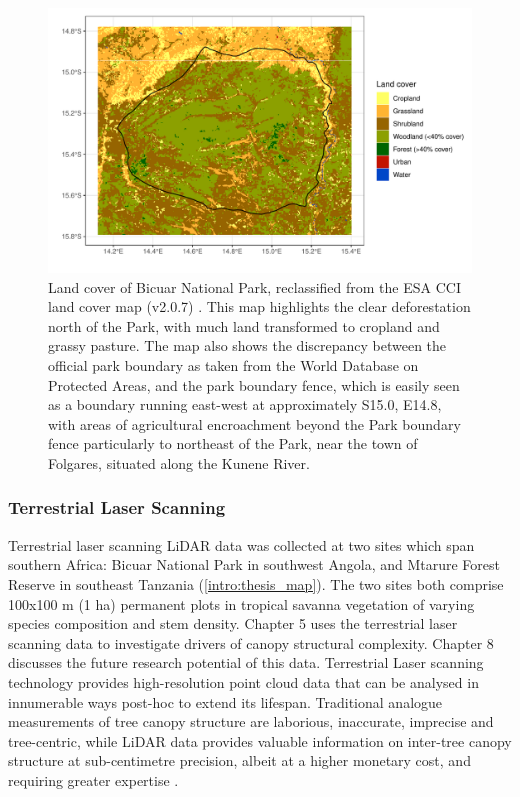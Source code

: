 \begin{refsection}
\begin{figure}[tb]
	\includegraphics[width=\textwidth]{img/bicuar_land_cover}
	\caption[Bicuar National Park land cover]{Land cover of Bicuar National Park, reclassified from the ESA CCI land cover map (v2.0.7) \citep{ESACCI}. This map highlights the clear deforestation north of the Park, with much land transformed to cropland and grassy pasture. The map also shows the discrepancy between the official park boundary as taken from the World Database on Protected Areas, and the park boundary fence, which is easily seen as a boundary running east-west at approximately S15.0\textdegree{}, E14.8\textdegree{}, with areas of agricultural encroachment beyond the Park boundary fence particularly to northeast of the Park, near the town of Folgares, situated along the Kunene River.}
	\label{intro:bicuar_land_cover}
\end{figure}


\subsubsection{Terrestrial Laser Scanning}
\label{intro:sssec:tls}

Terrestrial laser scanning LiDAR data was collected at two sites which span southern Africa: Bicuar National Park in southwest Angola, and Mtarure Forest Reserve in southeast Tanzania (\autoref{intro:thesis_map}). The two sites both comprise 100x100 m (1 ha) permanent plots in tropical savanna vegetation of varying species composition and stem density. Chapter 5 uses the terrestrial laser scanning data to investigate drivers of canopy structural complexity. Chapter 8 discusses the future research potential of this data. Terrestrial Laser scanning technology provides high-resolution point cloud data that can be analysed in innumerable ways post-hoc to extend its lifespan. Traditional analogue measurements of tree canopy structure are laborious, inaccurate, imprecise and tree-centric, while LiDAR data provides valuable information on inter-tree canopy structure at sub-centimetre precision, albeit at a higher monetary cost, and requiring greater expertise \citep{Xiao2019, Dassot2011}.

\newpage{}
\begingroup
{}
\printbibliography[heading=subbibintoc]
\endgroup

\end{refsection}


